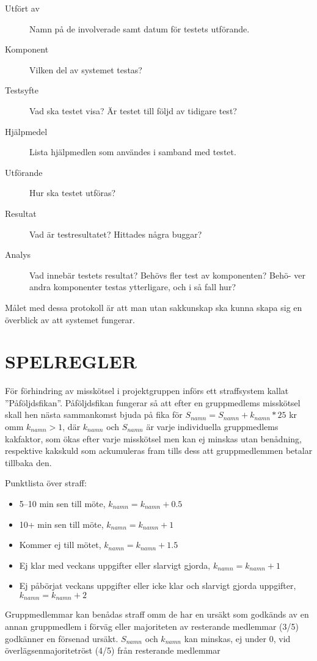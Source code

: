 \documentclass[a4paper]{article}
\begin{document}
\begin{description}
	\item[Utfört av] Namn på de involverade samt datum för testets utförande.

	\item[Komponent] Vilken del av systemet testas?

	\item[Testsyfte] Vad ska testet visa? Är testet till följd av tidigare test?

	\item[Hjälpmedel] Lista hjälpmedlen som användes i samband med testet. 

	\item[Utförande] Hur ska testet utföras?

	\item[Resultat] Vad är testresultatet? Hittades några buggar?

	\item[Analys] Vad innebär testets resultat? Behövs fler test av komponenten? Behö-
	ver andra komponenter testas ytterligare, och i så fall hur?
\end{description}

Målet med dessa protokoll är att man utan sakkunskap ska kunna skapa sig en överblick av att systemet fungerar.

\section{SPELREGLER}
\label{sec:spelregler}

För förhindring av misskötsel i projektgruppen införs ett straffsystem kallat ”Påföljdsfikan”. Påföljdsfikan fungerar så att efter en gruppmedlems misskötsel skall hen nästa sammankomst bjuda på fika för $S_{namn} = S_{namn} + k_{namn}*25$ kr omm $k_{namn}>1$, där $k_{namn}$ och $S_{namn}$ är varje individuella gruppmedlems kakfaktor, som ökas efter varje misskötsel men kan ej minskas utan benådning, respektive kakskuld som ackumuleras fram tills dess att gruppmedlemmen betalar tillbaka den.\\ \par
Punktlista över straff:
\begin{itemize}
	\item 5–10 min sen till möte, $k_{namn} = k_{namn} + 0.5$
	\item 10+ min sen till möte, $k_{namn} = k_{namn} + 1$
	\item Kommer ej till mötet, $k_{namn} = k_{namn} + 1.5$
	\item Ej klar med veckans uppgifter eller slarvigt gjorda, $k_{namn} = k_{namn} + 1$
	\item Ej påbörjat veckans uppgifter eller icke klar och slarvigt gjorda uppgifter, \indent $k_{namn} = k_{namn} + 2$
\end{itemize}
\par
Gruppmedlemmar kan benådas straff omm de har en ursäkt som godkänds av en annan gruppmedlem i förväg eller majoriteten av resterande medlemmar (3/5) godkänner en försenad ursäkt. $S_{namn}$ och $k_{namn}$ kan minskas, ej under 0, vid överlägsenmajoritetröst (4/5) från resterande medlemmar



%
%
\end{document}
